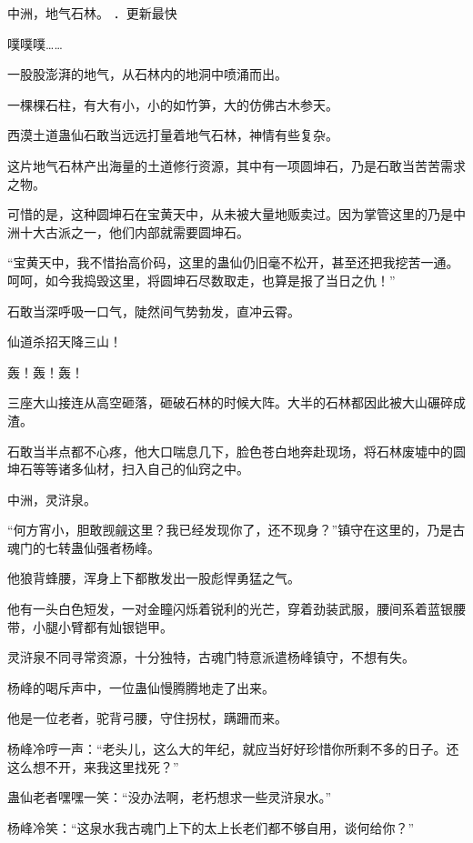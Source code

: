 
\begin{this_body}



中洲，地气石林。 ．更新最快

噗噗噗……

一股股澎湃的地气，从石林内的地洞中喷涌而出。

一棵棵石柱，有大有小，小的如竹笋，大的仿佛古木参天。

西漠土道蛊仙石敢当远远打量着地气石林，神情有些复杂。

这片地气石林产出海量的土道修行资源，其中有一项圆坤石，乃是石敢当苦苦需求之物。

可惜的是，这种圆坤石在宝黄天中，从未被大量地贩卖过。因为掌管这里的乃是中洲十大古派之一，他们内部就需要圆坤石。

“宝黄天中，我不惜抬高价码，这里的蛊仙仍旧毫不松开，甚至还把我挖苦一通。呵呵，如今我捣毁这里，将圆坤石尽数取走，也算是报了当日之仇！”

石敢当深呼吸一口气，陡然间气势勃发，直冲云霄。

仙道杀招天降三山！

轰！轰！轰！

三座大山接连从高空砸落，砸破石林的时候大阵。大半的石林都因此被大山碾碎成渣。

石敢当半点都不心疼，他大口喘息几下，脸色苍白地奔赴现场，将石林废墟中的圆坤石等等诸多仙材，扫入自己的仙窍之中。

中洲，灵浒泉。

“何方宵小，胆敢觊觎这里？我已经发现你了，还不现身？”镇守在这里的，乃是古魂门的七转蛊仙强者杨峰。

他狼背蜂腰，浑身上下都散发出一股彪悍勇猛之气。

他有一头白色短发，一对金瞳闪烁着锐利的光芒，穿着劲装武服，腰间系着蓝银腰带，小腿小臂都有灿银铠甲。

灵浒泉不同寻常资源，十分独特，古魂门特意派遣杨峰镇守，不想有失。

杨峰的喝斥声中，一位蛊仙慢腾腾地走了出来。

他是一位老者，驼背弓腰，守住拐杖，蹒跚而来。

杨峰冷哼一声：“老头儿，这么大的年纪，就应当好好珍惜你所剩不多的日子。还这么想不开，来我这里找死？”

蛊仙老者嘿嘿一笑：“没办法啊，老朽想求一些灵浒泉水。”

杨峰冷笑：“这泉水我古魂门上下的太上长老们都不够自用，谈何给你？”


\end{this_body}
